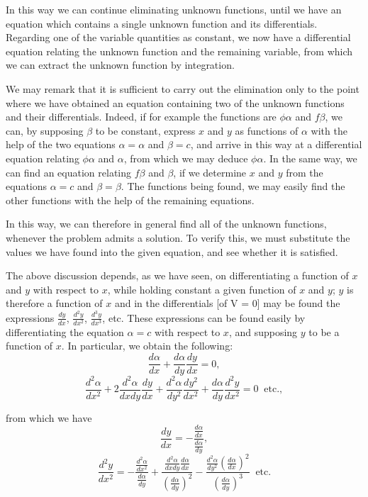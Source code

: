 \documentclass[12pt]{article}
\begin{document}
In this way we can continue eliminating unknown functions, until we have an equation which contains a single unknown function and its differentials.  Regarding one of the variable quantities as constant, we now have a differential equation relating the unknown function and the remaining variable, from which we can extract the unknown function by integration.  

We may remark that it is sufficient to carry out the elimination only to the point where we have obtained an equation containing two of the unknown functions and their differentials.  Indeed, if for example the functions are $\phi \alpha$ and $f \beta$, we can, by supposing $\beta$ to be constant, express $x$ and $y$ as functions of $\alpha$ with the help of the two equations $\alpha = \alpha$ and $\beta = c$, and arrive in this  way at a differential equation relating $\phi\alpha$ and $\alpha$, from which we may deduce $\phi \alpha$.  In the same way, we can find an equation relating $f\beta$ and $\beta$, if we determine $x$ and $y$ from the equations $\alpha = c$ and $\beta = \beta$.  The functions being found, we may easily find the other functions with the help of the remaining equations.  
 
 In this way, we can therefore in general find all of the unknown functions, whenever the problem admits a solution.  To verify this, we must substitute the values we have found into the given equation, and see whether it is satisfied.
 
The above discussion depends, as we have seen, on differentiating a function of $x$ and $y$ with respect to $x$, while holding constant a given function of $x$ and $y$; $y$ is therefore a function of $x$ and in the differentials [of V = 0] may be found the expressions $\frac{dy}{dx}$, $\frac{d^2y}{dx^2}$, $\frac{d^3y}{dx^3}$, etc.  These expressions can be found easily by differentiating the equation $\alpha = c$ with respect to $x$, and supposing $y$ to be a function of $x$.  In particular, we obtain the following:
 \[ \frac{d \alpha}{dx} + \frac{d \alpha}{dy} \frac{dy}{dx} = 0, \]
 \[ \frac{d^2\alpha}{dx^2} + 2 \frac{d^2\alpha}{dx dy}  \frac{dy}{dx} + \frac{d^2\alpha}{dy^2} \frac{dy^2}{dx^2} + \frac{d\alpha}{dy} \frac{d^2y}{dx^2} = 0 \mathrm{\; \; etc.,} \]
 
 from which we have
 \[ \frac{dy}{dx} = - \frac{\frac{d\alpha}{dx}}{\frac{d\alpha}{dy}} , \]
 \[ \frac{d^2y}{dx^2} = - \frac{\frac{d^2\alpha}{dx^2}}{\frac{d\alpha}{dy}} + \frac{\frac{d^2\alpha}{dx dy}\frac{d\alpha}{dx}}{\left(\frac{d\alpha}{dy}\right)^2} - \frac{\frac{d^2\alpha}{dy^2}\left(\frac{d\alpha}{dx}\right)^2}{\left(\frac{d\alpha}{dy}\right)^3} \mathrm{ \; \; etc.}\]
 
\end{document}
